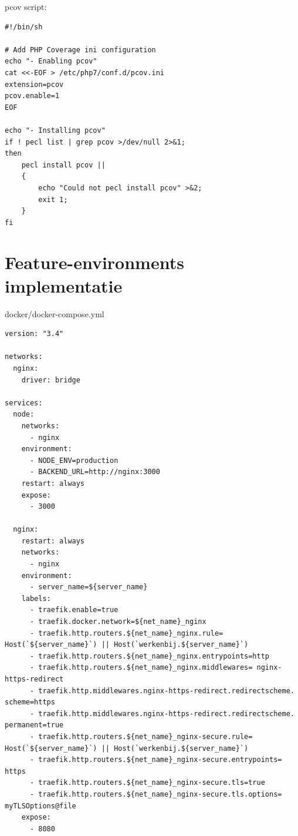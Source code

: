 pcov script:
\begin{verbatim}
#!/bin/sh

# Add PHP Coverage ini configuration
echo "- Enabling pcov"
cat <<-EOF > /etc/php7/conf.d/pcov.ini
extension=pcov
pcov.enable=1
EOF

echo "- Installing pcov"
if ! pecl list | grep pcov >/dev/null 2>&1;
then
    pecl install pcov ||
    {
        echo "Could not pecl install pcov" >&2;
        exit 1;
    }
fi
\end{verbatim}

\section{Feature-environments implementatie}

docker/docker-compose.yml
\begin{verbatim}
version: "3.4"

networks:
  nginx:
    driver: bridge

services:
  node:
    networks:
      - nginx
    environment:
      - NODE_ENV=production
      - BACKEND_URL=http://nginx:3000
    restart: always
    expose:
      - 3000

  nginx:
    restart: always
    networks:
      - nginx
    environment:
      - server_name=${server_name}
    labels:
      - traefik.enable=true
      - traefik.docker.network=${net_name}_nginx
      - traefik.http.routers.${net_name}_nginx.rule= Host(`${server_name}`) || Host(`werkenbij.${server_name}`)
      - traefik.http.routers.${net_name}_nginx.entrypoints=http
      - traefik.http.routers.${net_name}_nginx.middlewares= nginx-https-redirect
      - traefik.http.middlewares.nginx-https-redirect.redirectscheme. scheme=https
      - traefik.http.middlewares.nginx-https-redirect.redirectscheme. permanent=true
      - traefik.http.routers.${net_name}_nginx-secure.rule= Host(`${server_name}`) || Host(`werkenbij.${server_name}`)
      - traefik.http.routers.${net_name}_nginx-secure.entrypoints= https
      - traefik.http.routers.${net_name}_nginx-secure.tls=true
      - traefik.http.routers.${net_name}_nginx-secure.tls.options= myTLSOptions@file
    expose:
      - 8080
\end{verbatim}

